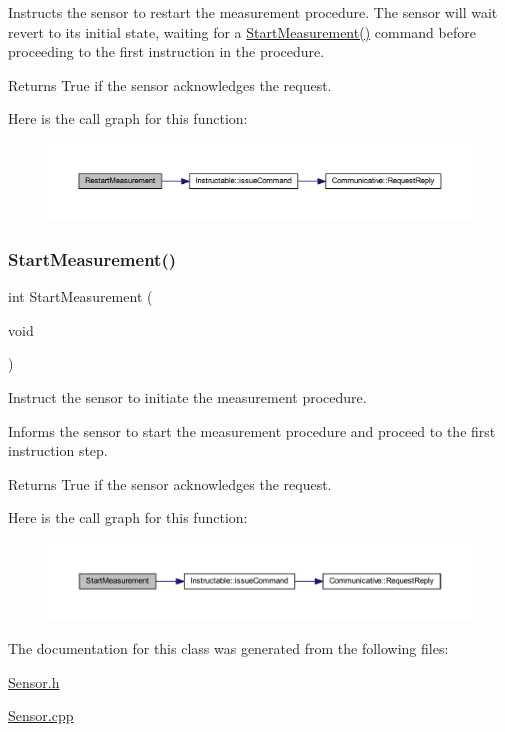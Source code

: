 Instructs the sensor to restart the measurement procedure. The sensor will wait revert to its initial state, waiting for a \mbox{\hyperlink{class_sensor_af0e64874a3d1b8ae19e3b623d244342a}{Start\+Measurement()}} command before proceeding to the first instruction in the procedure. \begin{DoxyReturn}{Returns}
True if the sensor acknowledges the request. 
\end{DoxyReturn}
Here is the call graph for this function\+:
\nopagebreak
\begin{figure}[H]
\begin{center}
\leavevmode
\includegraphics[width=350pt]{class_sensor_ad58e9acfc23f07af433f0e2596d786d7_cgraph}
\end{center}
\end{figure}
\mbox{\label{class_sensor_af0e64874a3d1b8ae19e3b623d244342a}} 
\subsubsection{\texorpdfstring{StartMeasurement()}{StartMeasurement()}}
{\footnotesize\ttfamily int Start\+Measurement (\begin{DoxyParamCaption}\item[{void}]{ }\end{DoxyParamCaption})}



Instruct the sensor to initiate the measurement procedure. 

Informs the sensor to start the measurement procedure and proceed to the first instruction step. \begin{DoxyReturn}{Returns}
True if the sensor acknowledges the request. 
\end{DoxyReturn}
Here is the call graph for this function\+:
\nopagebreak
\begin{figure}[H]
\begin{center}
\leavevmode
\includegraphics[width=350pt]{class_sensor_af0e64874a3d1b8ae19e3b623d244342a_cgraph}
\end{center}
\end{figure}


The documentation for this class was generated from the following files\+:\begin{DoxyCompactItemize}
\item 
\mbox{\hyperlink{_sensor_8h}{Sensor.\+h}}\item 
\mbox{\hyperlink{_sensor_8cpp}{Sensor.\+cpp}}\end{DoxyCompactItemize}
